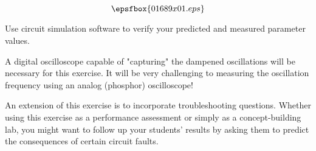 

$$\epsfbox{01689x01.eps}$$

\vfil \eject






Use circuit simulation software to verify your predicted and measured parameter values.







A digital oscilloscope capable of "capturing" the dampened oscillations will be necessary for this exercise.  It will be very challenging to measuring the oscillation frequency using an analog (phosphor) oscilloscope!

An extension of this exercise is to incorporate troubleshooting questions.  Whether using this exercise as a performance assessment or simply as a concept-building lab, you might want to follow up your students' results by asking them to predict the consequences of certain circuit faults.




